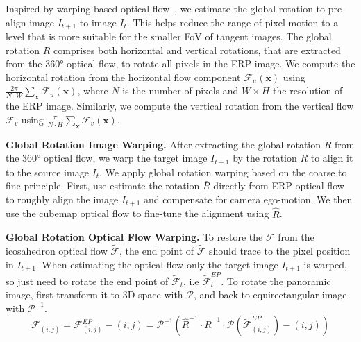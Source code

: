 Inspired by warping-based optical flow~\cite{BroxBPW2004}, we estimate the global rotation to pre-align image $I_{t+1}$ to image $I_{t}$.
This helps reduce the range of pixel motion to a level that is more suitable for the smaller FoV of tangent images.
%
The global rotation $R$ comprises both horizontal and vertical rotations, that are extracted from the 360° optical flow, to rotate all pixels in the ERP image.
%
We compute the horizontal rotation from the horizontal flow component $\mathcal{F}_u(\mathbf{x})$ using $\frac{2\pi}{N\cdot W}\sum_\mathbf{x}\mathcal{F}_u(\mathbf{x})$, where $N$ is the number of pixels and $W \!\times\! H$ the resolution of the ERP image.
%
Similarly, we compute the vertical rotation from the vertical flow $\mathcal{F}_v$ using $\frac{\pi}{N \cdot H}\sum_\mathbf{x}\mathcal{F}_v(\mathbf{x})$.


\textbf{Global Rotation Image Warping.}
After extracting  the global rotation $R$ from the 360° optical flow, we warp the target image $I_{t+1}$ by the rotation $R$ to align it to the source image $I_{t}$. %
%
We apply global rotation warping based on the coarse to fine principle.
First, use estimate the rotation $\bar{R}$ directly from ERP optical flow to roughly align the image $I_{t+1}$ and compensate for camera ego-motion.
We then use the cubemap optical flow to fine-tune the alignment using $\hat{R}$.


\textbf{Global Rotation Optical Flow Warping.}
To restore the $\mathcal{F}$ from the icosahedron optical flow $\tilde{\mathcal{F}}$, the end point of $\tilde{\mathcal{F}}$ should trace to the pixel position in $I_{t+1}$.
% 
When estimating the optical flow only the target image $I_{t+1}$ is warped, so just need to rotate the end point of $\tilde{\mathcal{F}}_t$, i.e $\tilde{\mathcal{F}}^{EP}_t$. 
%
To rotate the panoramic image, first transform it to 3D space with $\mathcal{P}$, and back to equirectangular image with $\mathcal{P}^{-1}$.
%
\begin{equation}\label{equ:approach:globalwarp}
	\mathcal{F}_{(i,j)} = \mathcal{F}^{EP}_{(i,j)} - (i,j)  
				= \mathcal{P}^{-1} \left( \hat{R}^{-1} \cdot \bar{R}^{-1} \cdot \mathcal{P}(\tilde{\mathcal{F}}^{EP}_{(i,j)}) - (i,j)\right)
\end{equation}
